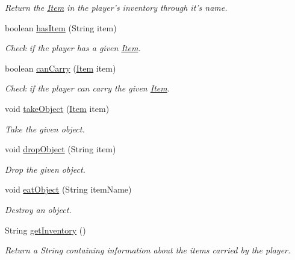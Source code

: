 \begin{DoxyCompactItemize}
\begin{DoxyCompactList}\small\item\em Return the \hyperlink{classItem}{Item} in the player's inventory through it's name. \end{DoxyCompactList}\item 
boolean \hyperlink{classPlayer_a90cb3f05b491eaed668fe54b9258b755}{has\-Item} (String item)
\begin{DoxyCompactList}\small\item\em Check if the player has a given \hyperlink{classItem}{Item}. \end{DoxyCompactList}\item 
boolean \hyperlink{classPlayer_ad84aab6c7b6ed8d58608adf0484f0268}{can\-Carry} (\hyperlink{classItem}{Item} item)
\begin{DoxyCompactList}\small\item\em Check if the player can carry the given \hyperlink{classItem}{Item}. \end{DoxyCompactList}\item 
void \hyperlink{classPlayer_a256305370cf457a32791d68c73e0b236}{take\-Object} (\hyperlink{classItem}{Item} item)
\begin{DoxyCompactList}\small\item\em Take the given object. \end{DoxyCompactList}\item 
void \hyperlink{classPlayer_a4fbdbd407197f43f4f7beca517182765}{drop\-Object} (String item)
\begin{DoxyCompactList}\small\item\em Drop the given object. \end{DoxyCompactList}\item 
void \hyperlink{classPlayer_a83141dd7c002b30a6e19b884daf26e8c}{eat\-Object} (String item\-Name)
\begin{DoxyCompactList}\small\item\em Destroy an object. \end{DoxyCompactList}\item 
String \hyperlink{classPlayer_a5c4667e6eca93d1bba69f7db022f2feb}{get\-Inventory} ()
\begin{DoxyCompactList}\small\item\em Return a String containing information about the items carried by the player. \end{DoxyCompactList}\end{DoxyCompactItemize}
